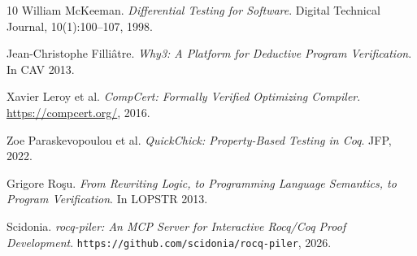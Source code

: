 \documentclass[11pt,a4paper]{article}
\begin{document}
\begin{thebibliography}{10}
William McKeeman.
\textit{Differential Testing for Software}.
Digital Technical Journal, 10(1):100--107, 1998.

Jean-Christophe Filli\^atre.
\textit{Why3: A Platform for Deductive Program Verification}.
In CAV 2013.

Xavier Leroy et al.
\textit{CompCert: Formally Verified Optimizing Compiler}.
\url{https://compcert.org/}, 2016.

Zoe Paraskevopoulou et al.
\textit{QuickChick: Property-Based Testing in Coq}.
JFP, 2022.

Grigore Ro\c{s}u.
\textit{From Rewriting Logic, to Programming Language Semantics, to Program Verification}.
In LOPSTR 2013.

Scidonia.
\textit{rocq-piler: An MCP Server for Interactive Rocq/Coq Proof Development}.
\texttt{https://github.com/scidonia/rocq-piler}, 2026.

\end{thebibliography}
\end{document}
